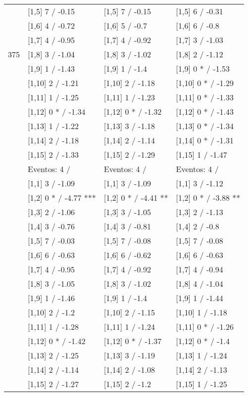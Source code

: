 \begin{table}
\begin{tabular}[t]{llll}
 & {}[1,5] 7  / -0.15 & {}[1,5] 7  / -0.15 & {}[1,5] 6  / -0.31\\
 & {}[1,6] 4  / -0.72 & {}[1,6] 5  / -0.7 & {}[1,6] 6  / -0.8\\
 & {}[1,7] 4  / -0.95 & {}[1,7] 4  / -0.92 & {}[1,7] 3  / -1.03\\
375 & {}[1,8] 3  / -1.04 & {}[1,8] 3  / -1.02 & {}[1,8] 2  / -1.12\\
\addlinespace
 & {}[1,9] 1  / -1.43 & {}[1,9] 1  / -1.4 & {}[1,9] 0 * / -1.53\\
 & {}[1,10] 2  / -1.21 & {}[1,10] 2  / -1.18 & {}[1,10] 0 * / -1.29\\
 & {}[1,11] 1  / -1.25 & {}[1,11] 1  / -1.23 & {}[1,11] 0 * / -1.33\\
 & {}[1,12] 0 * / -1.34 & {}[1,12] 0 * / -1.32 & {}[1,12] 0 * / -1.43\\
 & {}[1,13] 1  / -1.22 & {}[1,13] 3  / -1.18 & {}[1,13] 0 * / -1.34\\
\addlinespace
 & {}[1,14] 2  / -1.18 & {}[1,14] 2  / -1.14 & {}[1,14] 0 * / -1.31\\
 & {}[1,15] 2  / -1.33 & {}[1,15] 2  / -1.29 & {}[1,15] 1  / -1.47\\
 & Eventos:  4 / & Eventos:  4 / & Eventos:  4 /\\
 & {}[1,1] 3  / -1.09 & {}[1,1] 3  / -1.09 & {}[1,1] 3  / -1.12\\
 & {}[1,2] 0 * / -4.77 *** & {}[1,2] 0 * / -4.41 ** & {}[1,2] 0 * / -3.88 **\\
\addlinespace
 & {}[1,3] 2  / -1.06 & {}[1,3] 3  / -1.05 & {}[1,3] 2  / -1.13\\
 & {}[1,4] 3  / -0.76 & {}[1,4] 3  / -0.81 & {}[1,4] 2  / -0.8\\
 & {}[1,5] 7  / -0.03 & {}[1,5] 7  / -0.08 & {}[1,5] 7  / -0.08\\
 & {}[1,6] 6  / -0.63 & {}[1,6] 6  / -0.62 & {}[1,6] 6  / -0.63\\
 & {}[1,7] 4  / -0.95 & {}[1,7] 4  / -0.92 & {}[1,7] 4  / -0.94\\
\addlinespace
500 & {}[1,8] 3  / -1.05 & {}[1,8] 3  / -1.02 & {}[1,8] 4  / -1.04\\
 & {}[1,9] 1  / -1.46 & {}[1,9] 1  / -1.4 & {}[1,9] 1  / -1.44\\
 & {}[1,10] 2  / -1.2 & {}[1,10] 2  / -1.15 & {}[1,10] 1  / -1.18\\
 & {}[1,11] 1  / -1.28 & {}[1,11] 1  / -1.24 & {}[1,11] 0 * / -1.26\\
 & {}[1,12] 0 * / -1.42 & {}[1,12] 0 * / -1.37 & {}[1,12] 0 * / -1.4\\
\addlinespace
 & {}[1,13] 2  / -1.25 & {}[1,13] 3  / -1.19 & {}[1,13] 1  / -1.24\\
 & {}[1,14] 2  / -1.14 & {}[1,14] 2  / -1.08 & {}[1,14] 2  / -1.13\\
 & {}[1,15] 2  / -1.27 & {}[1,15] 2  / -1.2 & {}[1,15] 1  / -1.25\\
\bottomrule
\end{tabular}
\end{table}

